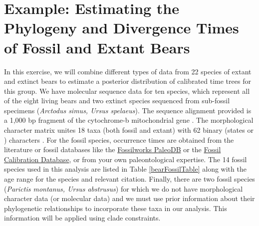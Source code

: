 \bigskip
\section{Example: Estimating the Phylogeny and Divergence Times of Fossil and Extant Bears}\label{sect:Exercise}

In this exercise, we will combine different types of data from 22 species of extant and extinct bears to estimate a posterior distribution of calibrated time trees for this group.
We have molecular sequence data for ten species, which represent all of the eight living bears and two extinct species sequenced from sub-fossil specimens (\textit{Arctodus simus, Ursus spelaeus}).
The sequence alignment provided is a 1,000 bp fragment of the cytochrome-b mitochondrial gene \citep{krause2008}.
The morphological character matrix unites 18 taxa (both fossil and extant) with 62 binary (states  or ) characters \citep{abella12}.
For the fossil species, occurrence times are obtained from the literature or fossil databases like the \href{http://fossilworks.org/}{Fossilworks PaleoDB} or the \href{http://fossilcalibrations.org/}{Fossil Calibration Database}, or from your own paleontological expertise. 
The 14 fossil species used in this analysis are listed in Table \ref{bearFossilTable} along with the age range for the species and relevant citation.
Finally, there are two fossil species (\textit{Parictis montanus, Ursus abstrusus}) for which we do not have morphological character data (or molecular data) and we must use prior information about their phylogenetic relationships to incorporate these taxa in our analysis. 
This information will be applied using clade constraints.

